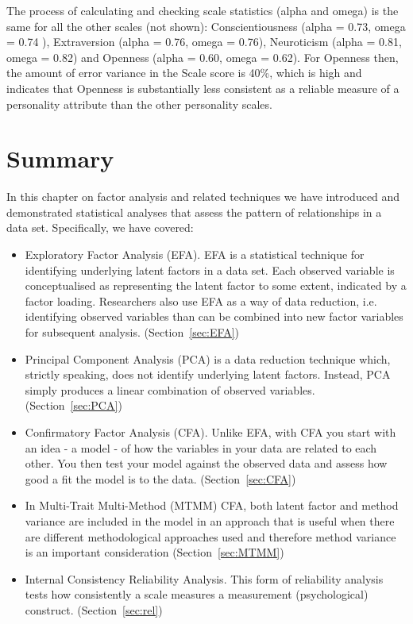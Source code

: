The process of calculating and checking scale statistics (alpha and omega) is the same for all the other scales (not shown): Conscientiousness (alpha = 0.73, omega = 0.74 ), Extraversion (alpha = 0.76, omega = 0.76), Neuroticism (alpha = 0.81, omega = 0.82) and Openness (alpha = 0.60, omega = 0.62).  For Openness then, the amount of error variance in the Scale score is 40\%, which is high and indicates that Openness is substantially less consistent as a reliable measure of a personality attribute than the other personality scales. 


\section{Summary}

In this chapter on factor analysis and related techniques we have introduced and demonstrated statistical analyses that assess the pattern of relationships in a data set. Specifically, we have covered: 

\begin{itemize} \itemsep -2pt
\item Exploratory Factor Analysis (EFA). EFA is a statistical technique for identifying underlying latent factors in a data set. Each observed variable is conceptualised as representing the latent factor to some extent, indicated by a factor loading. Researchers also use EFA as a way of data reduction, i.e. identifying observed variables than can be combined into new factor variables for subsequent analysis. (Section~\ref{sec:EFA})
\item Principal Component Analysis (PCA) is a data reduction technique which, strictly speaking, does not identify underlying latent factors. Instead, PCA simply produces a linear combination of observed variables. (Section~\ref{sec:PCA})
\item Confirmatory Factor Analysis (CFA). Unlike EFA, with CFA you start with an idea - a model - of how the variables in your data are related to each other. You then test your model against the observed data and assess how good a fit the model is to the data.  (Section~\ref{sec:CFA})
\item In Multi-Trait Multi-Method (MTMM) CFA, both latent factor and method variance are included in the model in an approach that is useful when there are different methodological approaches used and therefore method variance is an important consideration (Section~\ref{sec:MTMM})
\item Internal Consistency Reliability Analysis. This form of reliability analysis tests how consistently a scale measures a measurement (psychological) construct. (Section~\ref{sec:rel})
\end{itemize}
